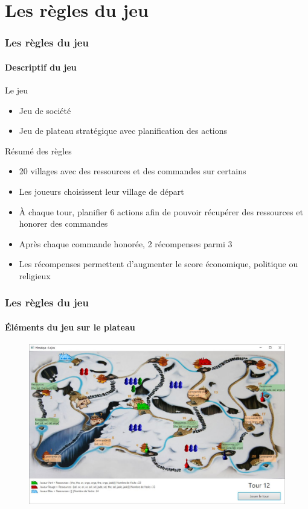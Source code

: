 \section{Les règles du jeu}

	\begin{frame}
	\frametitle{Les règles du jeu}
	\framesubtitle{Descriptif du jeu}
	
	\begin{block}{Le jeu}
		\begin{itemize}
			\item Jeu de société
			\item Jeu de plateau stratégique avec planification des actions
		\end{itemize}
	\end{block}
	
	\begin{block}{Résumé des règles}
		\begin{itemize}
			\item 20 villages avec des ressources et des commandes sur certains
			\item Les joueurs choisissent leur village de départ
			\item À chaque tour, planifier 6 actions afin de pouvoir récupérer des ressources et honorer des commandes
			\item Après chaque commande honorée, 2 récompenses parmi 3
			\item Les récompenses permettent d'augmenter le score économique, politique ou religieux
		\end{itemize}
	\end{block}
	
	\end{frame}


	\begin{frame}
		\frametitle{Les règles du jeu}
		\framesubtitle{Éléments du jeu sur le plateau}
		
		\begin{figure}[h]
		\centering
		\includegraphics[width=1\linewidth]{images/etat_jeu_avance}
		\label{fig:plateau}
		\end{figure}
	
	\end{frame}

